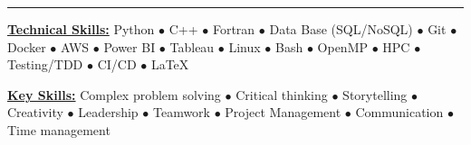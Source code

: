 \vspace*{-8mm}

\begin{center}
    \par\rule{1.0\textwidth}{0.6pt}
\end{center}
\vspace*{-6mm}


\begin{multicols}{2}
    \begin{spacing}{1}
        \href{.}{\bf Technical Skills:}
        Python $\bullet$ C++ $\bullet$ Fortran $\bullet$ Data Base (SQL/NoSQL) $\bullet$ Git $\bullet$ Docker $\bullet$ AWS $\bullet$ Power BI $\bullet$ Tableau $\bullet$ Linux $\bullet$ Bash $\bullet$ OpenMP $\bullet$ HPC $\bullet$ Testing/TDD $\bullet$ CI/CD $\bullet$ \LaTeX~ %

        \href{.}{\bf Key Skills:}
        Complex problem solving $\bullet$ Critical thinking $\bullet$ Storytelling $\bullet$ Creativity $\bullet$ Leadership $\bullet$ Teamwork $\bullet$ Project Management $\bullet$ Communication $\bullet$ Time management
    \end{spacing}
\end{multicols}


